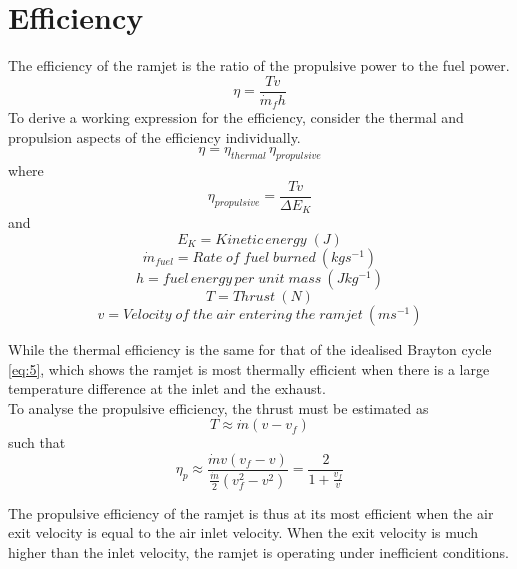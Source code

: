 \documentclass[12pt,onecolumn]{IEEEtran}
\begin{document}
\section{Efficiency}
\begin{flushleft}
The efficiency of the ramjet is the ratio of the propulsive power to the fuel power.\cite{greitzer_spakovsky_waitz}\\
\begin{equation}
 \eta = \frac{Tv}{\dot{m}_f h}
\end{equation}
To derive a working expression for the efficiency, consider the thermal and propulsion aspects of the efficiency individually.\\
\begin{equation}
\eta = \eta_{thermal}\,\eta_{propulsive}
\end{equation}
where\\
\begin{equation}
\eta_{propulsive}=\frac{Tv}{\Delta E_K}
\end{equation}
and
\[E_K =  Kinetic\,energy\;(J)\]
\[\dot{m}_{fuel} =  Rate\;of\;fuel\;burned\:(kgs^{-1})\]
\[h = fuel\,energy\,per\;unit\;mass\:(Jkg^{-1})\]
\[T =  Thrust\:(N)\]
\[v =  Velocity\;of\;the\;air\;entering\;the\;ramjet\:(ms^{-1})\]


While the thermal efficiency is the same for that of the idealised Brayton cycle \eqref{eq:5}, which shows the ramjet is most thermally efficient when there is a large temperature difference at the inlet and the exhaust.\\
To analyse the propulsive efficiency, the thrust must be estimated as\\
\begin{equation}
T\approx\dot{m}(v-v_f)
\end{equation}
\vspace{1mm}
such that\\
\begin{equation}
\eta_p\approx\frac{\dot{m}v(v_f-v)}{\frac{\dot{m}}{2}(v_f^2-v^2)}=\frac{2}{1+\frac{v_f}{v}}
\end{equation}

The propulsive efficiency of the ramjet is thus at its most efficient when the air exit velocity is equal to the air inlet velocity. When the exit velocity is much higher than the inlet velocity, the ramjet is operating under inefficient conditions.
\end{flushleft}


\end{document}
